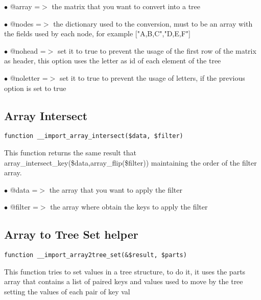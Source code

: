 \documentclass[a4paper]{book}
\begin{document}
\begin{compactitem}
\item[\color{myblue}$\bullet$] @array    =$>$ the matrix that you want to convert into a tree
\item[\color{myblue}$\bullet$] @nodes    =$>$ the dictionary used to the conversion, must to be an array with
             the fields used by each node, for example ["A,B,C","D,E,F"]
\item[\color{myblue}$\bullet$] @nohead   =$>$ set it to true to prevent the usage of the first row of the
             matrix as header, this option uses the letter as id of each
             element of the tree
\item[\color{myblue}$\bullet$] @noletter =$>$ set it to true to prevent the usage of letters, if the
             previous option is set to true
\end{compactitem}

\hypertarget{toc161}{}
\subsection{Array Intersect}

\begin{lstlisting}
function __import_array_intersect($data, $filter)
\end{lstlisting}

This function returns the same result that array\_intersect\_key(\$data,array\_flip(\$filter))
maintaining the order of the filter array.

\begin{compactitem}
\item[\color{myblue}$\bullet$] @data   =$>$ the array that you want to apply the filter
\item[\color{myblue}$\bullet$] @filter =$>$ the array where obtain the keys to apply the filter
\end{compactitem}

\hypertarget{toc162}{}
\subsection{Array to Tree Set helper}

\begin{lstlisting}
function __import_array2tree_set(&$result, $parts)
\end{lstlisting}

This function tries to set values in a tree structure, to do it, it uses
the parts array that contains a list of paired keys and values used to move
by the tree setting the values of each pair of key val
\end{document}
